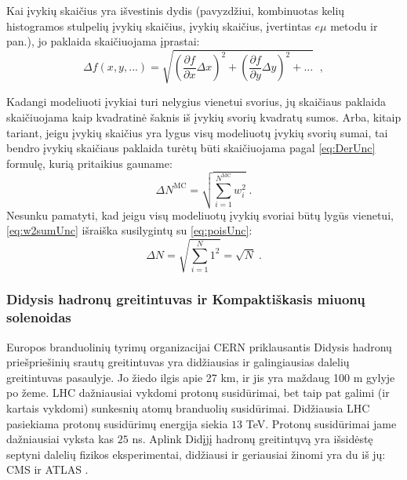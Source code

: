 \documentclass[a4paper, 12pt]{article}
\newlength\q
\begin{document}
Kai įvykių skaičius yra išvestinis dydis (pavyzdžiui, kombinuotas kelių histogramos stulpelių įvykių skaičius, įvykių skaičius, įvertintas $e\mu$ metodu ir pan.), jo paklaida skaičiuojama įprastai:
\begin{equation}
\Delta f(x, y, ...) = \sqrt{\left(\frac{\partial f}{\partial x}\Delta x\right)^{2}+\left(\frac{\partial f}{\partial y}\Delta y\right)^{2}+...} \;\; \mathrm{,}
\label{eq:DerUnc}
\end{equation}

Kadangi modeliuoti įvykiai turi nelygius vienetui svorius, jų skaičiaus paklaida skaičiuojama kaip kvadratinė šaknis iš įvykių svorių kvadratų sumos. Arba, kitaip tariant, jeigu įvykių skaičius yra lygus visų modeliuotų įvykių svorių sumai, tai bendro įvykių skaičiaus paklaida turėtų būti skaičiuojama pagal \eqref{eq:DerUnc} formulę, kurią pritaikius gauname:
\begin{equation}
\Delta N^{\mathrm{MC}} = \sqrt{\sum_{i=1}^{N^{\mathrm{MC}}}w_{i}^{2}} \; .
\label{eq:w2sumUnc}
\end{equation}
Nesunku pamatyti, kad jeigu visų modeliuotų įvykių svoriai būtų lygūs vienetui, \eqref{eq:w2sumUnc} išraiška susilygintų su \eqref{eq:poisUnc}:
\begin{equation}
\Delta N = \sqrt{\sum_{i=1}^{N}1^{2}}=\sqrt{N} \; .
\label{eq:Useless}
\end{equation}

\vspace{-0.3cm}
\subsubsection{Didysis hadronų greitintuvas ir Kompaktiškasis miuonų solenoidas}
Europos branduolinių tyrimų organizacijai CERN priklausantis Didysis hadronų priešpriešinių srautų greitintuvas yra didžiausias ir galingiausias dalelių greitintuvas pasaulyje. Jo žiedo ilgis apie 27 km, ir jis yra maždaug 100 m gylyje po žeme. LHC dažniausiai vykdomi protonų susidūrimai, bet taip pat galimi (ir kartais vykdomi) sunkesnių atomų branduolių susidūrimai. Didžiausia LHC pasiekiama protonų susidūrimų energija siekia $13$ TeV. Protonų susidūrimai jame dažniausiai vyksta kas $25$ ns. Aplink Didįjį hadronų greitintųvą yra išsidėstę septyni dalelių fizikos eksperimentai, didžiausi ir geriausiai žinomi yra du iš jų: CMS ir ATLAS \cite{LHCexperiments}.
\end{document}
